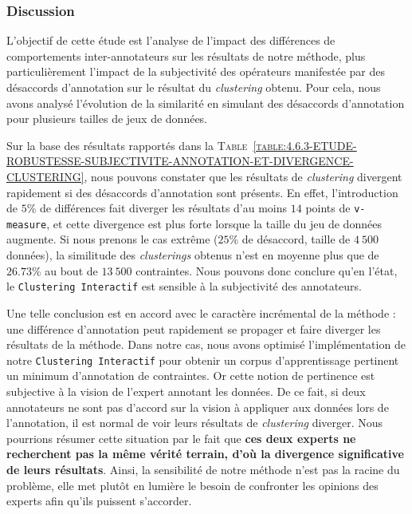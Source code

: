 		\subsubsection{Discussion}
		
			L'objectif de cette étude est l'analyse de l'impact des différences de comportements inter-annotateurs sur les résultats de notre méthode, plus particulièrement l'impact de la subjectivité des opérateurs manifestée par des désaccords d'annotation sur le résultat du \textit{clustering} obtenu.
			Pour cela, nous avons analysé l'évolution de la similarité en simulant des désaccords d'annotation pour plusieurs tailles de jeux de données.
			
			Sur la base des résultats rapportés dans la \textsc{Table~\ref{table:4.6.3-ETUDE-ROBUSTESSE-SUBJECTIVITE-ANNOTATION-ET-DIVERGENCE-CLUSTERING}}, nous pouvons constater que les résultats de \textit{clustering} divergent rapidement si des désaccords d'annotation sont présents.
			En effet, l'introduction de $5$\% de différences fait diverger les résultats d'au moins $14$ points de \texttt{v-measure}, et cette divergence est plus forte lorsque la taille du jeu de données augmente.
			Si nous prenons le cas extrême ($25$\% de désaccord, taille de $4~500$ données), la similitude des \textit{clusterings} obtenus n'est en moyenne plus que de $26.73$\% au bout de $13~500$ contraintes.
			Nous pouvons donc conclure qu'en l'état, le \texttt{Clustering Interactif} est sensible à la subjectivité des annotateurs.
			
			Une telle conclusion est en accord avec le caractère incrémental de la méthode : une différence d'annotation peut rapidement se propager et faire diverger les résultats de la méthode.
			Dans notre cas, nous avons optimisé l'implémentation de notre \texttt{Clustering Interactif} pour obtenir un corpus d'apprentissage pertinent un minimum d'annotation de contraintes.
			Or cette notion de pertinence est subjective à la vision de l'expert annotant les données.
			De ce fait, si deux annotateurs ne sont pas d'accord sur la vision à appliquer aux données lors de l'annotation, il est normal de voir leurs résultats de \textit{clustering} diverger.
			Nous pourrions résumer cette situation par le fait que \textbf{ces deux experts ne recherchent pas la même vérité terrain, d'où la divergence significative de leurs résultats}.
			Ainsi, la sensibilité de notre méthode n'est pas la racine du problème, elle met plutôt en lumière le besoin de confronter les opinions des experts afin qu'ils puissent s'accorder.
			
